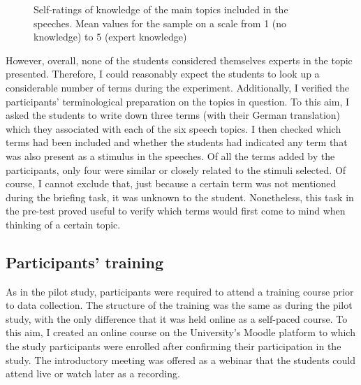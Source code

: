 \begin{figure}
\caption[Participants' knowledge of key speech topics]{Self-ratings of knowledge of the main topics included in the speeches. Mean values for the sample on a scale from 1 (no knowledge) to 5 (expert knowledge)}
\label{fig:knowledgetopics}
\end{figure}

However, overall, none of the students considered themselves experts in the topic presented. Therefore, I could reasonably expect the students to look up a considerable number of terms during the experiment. Additionally, I verified the participants' terminological preparation on the topics in question. To this aim, I asked the students to write down three terms (with their German translation) which they associated with each of the six speech topics. I then checked which terms had been included and whether the students had indicated any term that was also present as a stimulus in the speeches. Of all the terms added by the participants, only four were similar or closely related to the stimuli selected. Of course, I cannot exclude that, just because a certain term was not mentioned during the briefing task, it was unknown to the student. Nonetheless, this task in the pre-test proved useful to verify which terms would first come to mind when thinking of a certain topic.
\subsection{Participants' training} \label{training_MS}
As in the pilot study, participants were required to attend a training course prior to data collection. The structure of the training was the same as during the pilot study, with the only difference that it was held online as a self-paced course. To this aim, I created an online course on the University's Moodle platform to which the study participants were enrolled after confirming their participation in the study. The introductory meeting was offered as a webinar that the students could attend live or watch later as a recording.

